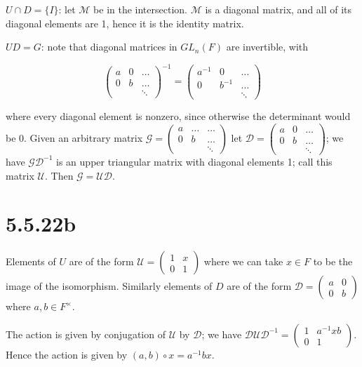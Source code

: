 \documentclass{article}
\def\inv{{-1}}
\begin{document}
$U \cap D = \{I\}$: let $\mathcal{M}$ be in the intersection. $\mathcal{M}$ is a diagonal matrix, and all of its diagonal elements are 1, hence it is the identity matrix.

$UD = G$: note that diagonal matrices in $GL_n(F)$ are invertible, with

\[ 
\begin{pmatrix} a & 0 & \ldots \\ 0 & b & \ldots \\ & & \ddots \end{pmatrix}^\inv =
\begin{pmatrix} a^\inv & 0 & \ldots \\ 0 & b^\inv & \ldots \\ & & \ddots \end{pmatrix}
\]

where every diagonal element is nonzero, since otherwise the determinant would be 0. Given an arbitrary matrix $\mathcal{G} = \begin{pmatrix} a & \ldots & \ldots \\ 0 & b & \ldots \\ & & \ddots \end{pmatrix}$ let $\mathcal{D} = \begin{pmatrix} a & 0 & \ldots \\ 0 & b & \ldots \\ & & \ddots \end{pmatrix}$; we have $\mathcal{G} \mathcal{D}^\inv$ is an upper triangular matrix with diagonal elements 1; call this matrix $\mathcal{U}$. Then $\mathcal{G} = \mathcal{U} \mathcal{D}$.
\section*{5.5.22b}

Elements of $U$ are of the form $\mathcal{U} = \begin{pmatrix} 1 & x \\ 0 & 1 \end{pmatrix}$ where we can take $x \in F$ to be the image of the isomorphism. Similarly elements of $D$ are of the form $\mathcal{D} = \begin{pmatrix} a & 0 \\ 0 & b \end{pmatrix}$ where $a, b \in F^\times$.

The action is given by conjugation of $\mathcal{U}$ by $\mathcal{D}$; we have $\mathcal{D} \mathcal{U} \mathcal{D}^\inv = \begin{pmatrix} 1 & a^\inv x b \\ 0 & 1 \end{pmatrix}$. Hence the action is given by $(a, b) \circ x =  a^\inv b x$.
\end{document}
